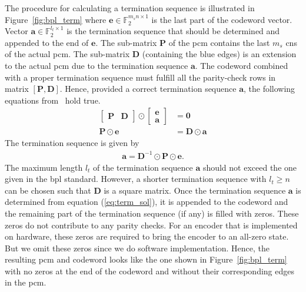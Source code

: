 The procedure for calculating a termination sequence is illustrated in Figure~\ref{fig:bpl_term} where $\mathbf{e}\in\mathbb{F}_2^{m_sn\times 1}$ is the last part of the codeword vector. Vector $\mathbf{a}\in\mathbb{F}_2^{l_t\times 1}$ is the termination sequence that should be determined and appended to the end of $\mathbf{e}$. The sub-matrix $\mathbf{P}$ of the \ac{pcm} contains the last $m_s$ \acp{cn} of the actual \ac{pcm}. The sub-matrix $\mathbf{D}$ (containing the blue edges) is an extension to the actual \ac{pcm} due to the termination sequence $\mathbf{a}$. The codeword combined with a proper termination sequence must fulfill all the parity-check rows in matrix $[\mathbf{P},\mathbf{D}]$. Hence, provided a correct termination sequence $\mathbf{a}$, the following equations from~\cite{Chen2006} hold true.
\begin{align}
\begin{bmatrix}\mathbf{P} &\mathbf{D}\end{bmatrix}\odot
\begin{bmatrix}
\mathbf{e}\\
\mathbf{a}
\end{bmatrix}&=\mathbf{0}\\
\mathbf{P}\odot\mathbf{e}&=\mathbf{D}\odot\mathbf{a}
\end{align}
The termination sequence is given by
\begin{align}\label{eq:term_sol}
\mathbf{a}=\mathbf{D}^{-1}\odot\mathbf{P}\odot\mathbf{e}.
\end{align}
The maximum length $l_t$ of the termination sequence $\mathbf{a}$ should not exceed the one given in the \ac{bpl} standard. However, a shorter termination sequence with $l_t\geq n$ can be chosen such that $\mathbf{D}$ is a square matrix. Once the termination sequence $\mathbf{a}$ is determined from equation (\ref{eq:term_sol}), it is appended to the codeword and the remaining part of the termination sequence (if any) is filled with zeros. These zeros do not contribute to any parity checks. For an encoder that is implemented on hardware, these zeros are required to bring the encoder to an all-zero state. But we omit these zeros since we do software implementation. Hence, the resulting \ac{pcm} and codeword looks like the one shown in Figure~\ref{fig:bpl_term} with no zeros at the end of the codeword and without their corresponding edges in the \ac{pcm}.

